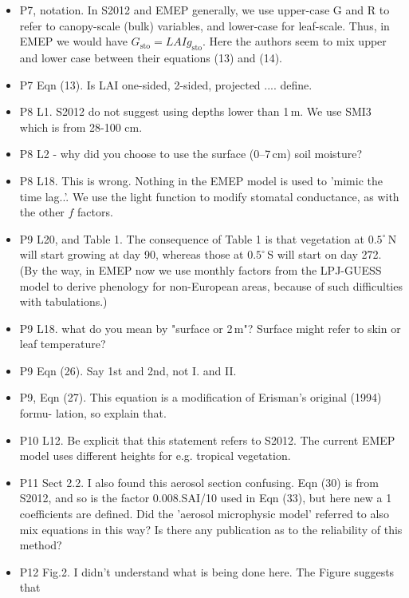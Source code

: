 \documentclass{scrartcl}
\begin{document}
\begin{itemize}
{have more or less been used until today.}
\item {\color{blue}P7, notation. In S2012 and EMEP generally, we use upper-case G and R to refer
to canopy-scale (bulk) variables, and lower-case for leaf-scale. Thus, in EMEP
we would have $G_\mathrm{sto} = LAI g_\mathrm{sto}$. Here the authors seem to mix upper and lower
case between their equations (13) and (14).}
\item {\color{blue}P7 Eqn (13). Is LAI one-sided, 2-sided, projected .... define.}
\item {\color{blue}P8 L1. S2012 do not suggest using depths lower than 1\,m. We use SMI3 which
is from 28-100 cm.}
\item {\color{blue}P8 L2 - why did you choose to use the surface (0--7\,cm) soil moisture?}
\item {\color{blue}P8 L18. This is wrong. Nothing in the EMEP model is used to ’mimic the
time lag..’. We use the light function to modify stomatal conductance, as with the
other $f$ factors.}
\item {\color{blue}P9 L20, and Table 1. The consequence of Table 1 is that vegetation at $0.5^\circ\,\mathrm{N}$
will start growing at day 90, whereas those at $0.5^\circ\,\mathrm{S}$ will start on day 272. (By the
way, in EMEP now we use monthly factors from the LPJ-GUESS model to derive
phenology for non-European areas, because of such difficulties with tabulations.)}
\item {\color{blue}P9 L18. what do you mean by "surface or 2\,m"? Surface might refer to skin or
leaf temperature?}
\item {\color{blue}P9 Eqn (26). Say 1st and 2nd, not I. and II.}
\item {\color{blue}P9, Eqn (27). This equation is a modification of Erisman’s original (1994) formu-
lation, so explain that.}
\item {\color{blue}P10 L12. Be explicit that this statement refers to S2012. The current EMEP
model uses different heights for e.g. tropical vegetation.}
\item {\color{blue}P11 Sect 2.2. I also found this aerosol section confusing. Eqn (30) is from S2012,
and so is the factor 0.008.SAI/10 used in Eqn (33), but here new a 1 coefficients
are defined. Did the ’aerosol microphysic model’ referred to also mix equations
in this way? Is there any publication as to the reliability of this method?}
\item {\color{blue}P12 Fig.2. I didn’t understand what is being done here. The Figure suggests that
}
\end{itemize}
\end{document}
